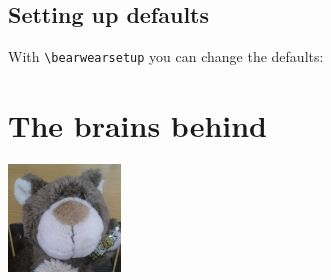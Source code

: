  \subsection{Setting up defaults}
 
 With \lstinline|\bearwearsetup| you can change the defaults:
 
 \begin{tcblisting}{}
 \tikz{\bear;\bearwear;}\tikz{\bear;\bearwear;}
 \end{tcblisting}
 \section{The brains behind \bearwearlogo{}}
 \includegraphics[width=3cm]{baer}
